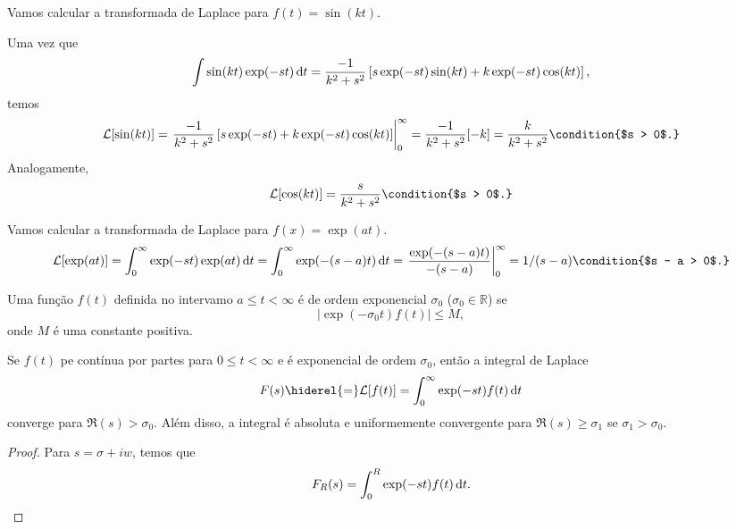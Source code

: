 \begin{exem}
  Vamos calcular a transformada de Laplace para $f(t) = \sin(kt)$.

  Uma vez que
  \begin{dmath*}
    \int \sin(k t) \exp(-s t) \vi{t} = \frac{-1}{k^2 + s^2} \left[ s \exp(-s t)
    \sin(k t) + k \exp(-s t) \cos(k t) \right],
  \end{dmath*}
  temos
  \begin{dmath*}
    \mathcal{L}[\sin(k t)] = \left. \frac{-1}{k^2 + s^2} \left[ s \exp(-s t) + k
    \exp(-s t) \cos(k t) \right] \right|_0^{\infty}
    = \frac{-1}{k^2 + s^2} [-k]
    = \frac{k}{k^2 + s^2} \condition{$s > 0$.}
  \end{dmath*}
  Analogamente,
  \begin{dmath*}
    \mathcal{L}[\cos(k t)] = \frac{s}{k^2 + s^2} \condition{$s > 0$.}
  \end{dmath*}
\end{exem}

\begin{exem}
  Vamos calcular a transformada de Laplace para $f(x) = \exp(a t)$.
  \begin{dmath*}
    \mathcal{L}[\exp(a t)] = \int_0^{\infty} \exp(-s t) \exp(a t) \vi{t}
    = \int_0^{\infty} \exp(- (s - a) t) \vi{t}
    = \left. \frac{\exp(- (s - a) t)}{- (s - a)} \right|_0^{\infty}
    = 1 / (s - a) \condition{$s - a > 0$.}
  \end{dmath*}
\end{exem}

\begin{defi}
  Uma função $f(t)$ definida no intervamo $a \leq t < \infty$ é de ordem
  exponencial $\sigma_0$ ($\sigma_0 \in \mathbb{R}$) se
  \begin{dmath*}
    | \exp(-\sigma_0 t) f(t) | \leq M,
  \end{dmath*}
  onde $M$ é uma constante positiva.
\end{defi}

\begin{teo}
  Se $f(t)$ pe contínua por partes para $0 \leq t < \infty$ e é exponencial de
  ordem $\sigma_0$, então a integral de Laplace
  \begin{dmath*}
    F(s) \hiderel{=} \mathcal{L}[f(t)] = \int_0^{\infty} \exp(-s t) f(t) \vi{t}
  \end{dmath*}
  converge para $\Re(s) > \sigma_0$. Além disso, a integral é absoluta e
  uniformemente convergente para $\Re(s) \geq \sigma_1$ se $\sigma_1 >
  \sigma_0$.
\end{teo}
\begin{proof}
  Para $s = \sigma + i w$, temos que
  \begin{dmath*}
    F_R(s) = \int_0^R \exp(-s t) f(t) \vi{t}.
  \end{dmath*}
\end{proof}

